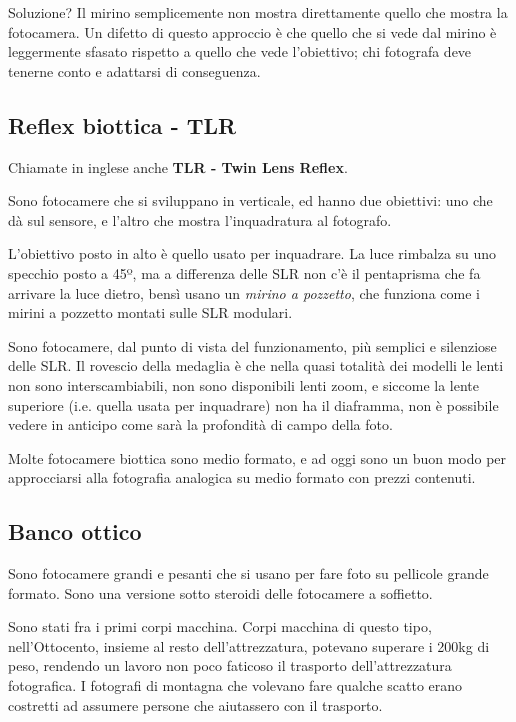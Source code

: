 Soluzione? Il mirino semplicemente non mostra direttamente quello che mostra la fotocamera. Un difetto di questo approccio è che quello che si vede dal mirino è leggermente sfasato rispetto a quello che vede l'obiettivo; chi fotografa deve tenerne conto e adattarsi di conseguenza.


\subsection{Reflex biottica - TLR} \label{subsec:tlr}
Chiamate in inglese anche \textbf{TLR - Twin Lens Reflex}.

Sono fotocamere che si sviluppano in verticale, ed hanno due obiettivi: uno che dà sul sensore, e l'altro che mostra l'inquadratura al fotografo.

L'obiettivo posto in alto è quello usato per inquadrare. La luce rimbalza su uno specchio posto a 45º, ma a differenza delle SLR non c'è il pentaprisma che fa arrivare la luce dietro, bensì usano un \textit{mirino a pozzetto}, che funziona come i mirini a pozzetto montati sulle SLR modulari.

Sono fotocamere, dal punto di vista del funzionamento, più semplici e silenziose delle SLR. Il rovescio della medaglia è che nella quasi totalità dei modelli le lenti non sono interscambiabili, non sono disponibili lenti zoom, e siccome la lente superiore (i.e. quella usata per inquadrare) non ha il diaframma, non è possibile vedere in anticipo come sarà la profondità di campo della foto.

Molte fotocamere biottica sono medio formato, e ad oggi sono un buon modo per approcciarsi alla fotografia analogica su medio formato con prezzi contenuti.


\subsection{Banco ottico} \label{subsec:bancoottico}
Sono fotocamere grandi e pesanti che si usano per fare foto su pellicole grande formato. Sono una versione sotto steroidi delle fotocamere a soffietto.

Sono stati fra i primi corpi macchina. Corpi macchina di questo tipo, nell'Ottocento, insieme al resto dell'attrezzatura, potevano superare i 200kg di peso, rendendo un lavoro non poco faticoso il trasporto dell'attrezzatura fotografica.
I fotografi di montagna che volevano fare qualche scatto erano costretti ad assumere persone che aiutassero con il trasporto.

